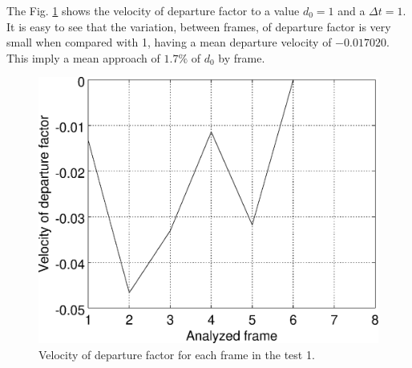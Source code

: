 The Fig. \ref{fig:res_graph1v} shows the velocity of departure factor
to a value $d_0=1$ and a $\Delta t=1$. It is easy to see that the variation,
between frames, of departure factor is very small when compared with 1, 
having a mean departure velocity of $-0.017020$. This imply a mean approach of $1.7\%$ of $d_0$
by frame.
\begin{figure}[!hbt]
\centering
\includegraphics[width=0.8\columnwidth]{images/graph1v.eps}
\caption{Velocity of departure factor for each frame in the test 1.}
\label{fig:res_graph1v}
\end{figure}


